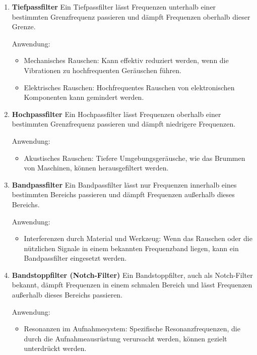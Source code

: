 \begin{enumerate}

\item \textbf{Tiefpassfilter}
Ein Tiefpassfilter lässt Frequenzen unterhalb einer bestimmten Grenzfrequenz passieren und dämpft Frequenzen oberhalb dieser Grenze.

Anwendung:
\begin{itemize}
    \item Mechanisches Rauschen: Kann effektiv reduziert werden, wenn die Vibrationen zu hochfrequenten Geräuschen führen.
    \item Elektrisches Rauschen: Hochfrequentes Rauschen von elektronischen Komponenten kann gemindert werden.
\end{itemize}

\item \textbf{Hochpassfilter}
Ein Hochpassfilter lässt Frequenzen oberhalb einer bestimmten Grenzfrequenz passieren und dämpft niedrigere Frequenzen.

Anwendung:
\begin{itemize}
    \item Akustisches Rauschen: Tiefere Umgebungsgeräusche, wie das Brummen von Maschinen, können herausgefiltert werden.
\end{itemize}

\item \textbf{Bandpassfilter}
Ein Bandpassfilter lässt nur Frequenzen innerhalb eines bestimmten Bereichs passieren und dämpft Frequenzen außerhalb dieses Bereichs.

Anwendung:
\begin{itemize}
    \item Interferenzen durch Material und Werkzeug: Wenn das Rauschen oder die nützlichen Signale in einem bekannten Frequenzband liegen, kann ein Bandpassfilter eingesetzt werden.
\end{itemize}

\item \textbf{Bandstoppfilter (Notch-Filter)}
Ein Bandstoppfilter, auch als Notch-Filter bekannt, dämpft Frequenzen in einem schmalen Bereich und lässt Frequenzen außerhalb dieses Bereichs passieren.

Anwendung:
\begin{itemize}
    \item Resonanzen im Aufnahmesystem: Spezifische Resonanzfrequenzen, die durch die Aufnahmeausrüstung verursacht werden, können gezielt unterdrückt werden.
\end{itemize}
\end{enumerate}

